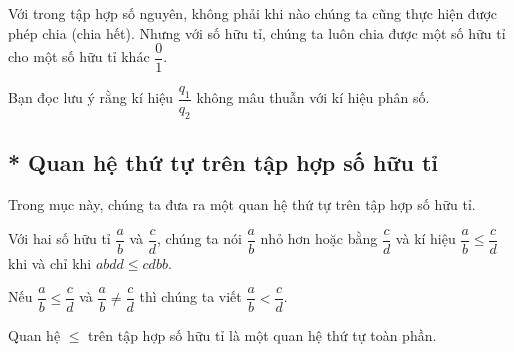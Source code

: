 Với trong tập hợp số nguyên, không phải khi nào chúng ta cũng thực hiện được phép chia (chia hết). Nhưng với số hữu tỉ, chúng ta luôn chia được một số hữu tỉ cho một số hữu tỉ khác $\dfrac{0}{1}$.

Bạn đọc lưu ý rằng kí hiệu $\dfrac{q_{1}}{q_{2}}$ không mâu thuẫn với kí hiệu phân số.

\subsection{* Quan hệ thứ tự trên tập hợp số hữu tỉ}

Trong mục này, chúng ta đưa ra một quan hệ thứ tự trên tập hợp số hữu tỉ.
\begin{definition}
    Với hai số hữu tỉ $\dfrac{a}{b}$ và $\dfrac{c}{d}$, chúng ta nói $\dfrac{a}{b}$ nhỏ hơn hoặc bằng $\dfrac{c}{d}$ và kí hiệu $\dfrac{a}{b}\leq \dfrac{c}{d}$ khi và chỉ khi $abdd \leq cdbb$.

    Nếu $\dfrac{a}{b}\leq \dfrac{c}{d}$ và $\dfrac{a}{b}\ne\dfrac{c}{d}$ thì chúng ta viết $\dfrac{a}{b} < \dfrac{c}{d}$.
\end{definition}

\begin{theorem}
    Quan hệ $\leq$ trên tập hợp số hữu tỉ là một quan hệ thứ tự toàn phần.
\end{theorem}

